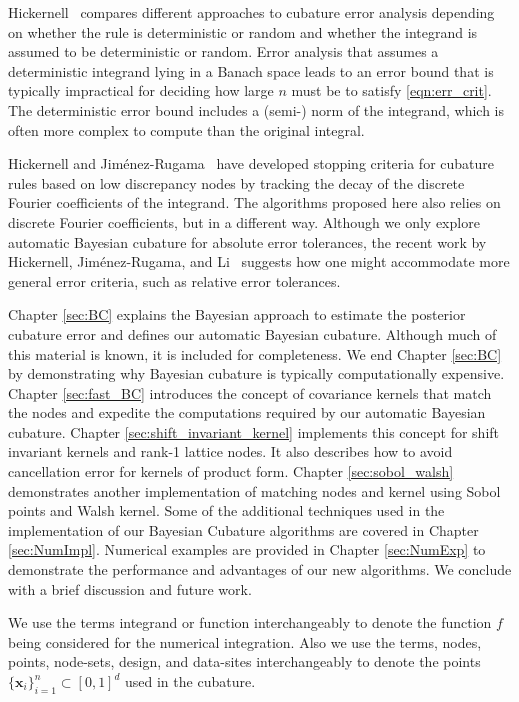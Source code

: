 \documentclass{iitthesis}          %
\newcommand{\bm}[1]{\boldsymbol{#1}}
\newcommand{\vx}{\bm{x}}
\begin{document}

Hickernell~\cite{Hic17a} compares different approaches to cubature error analysis depending on whether the rule is deterministic or random and whether the integrand is assumed to be deterministic or random.  Error analysis that assumes a deterministic integrand lying in a Banach space leads to an error bound that is typically impractical for deciding how large $n$ must be to satisfy \eqref{eqn:err_crit}.  The deterministic error bound includes a (semi-) norm of the integrand, which is often more complex to compute than the original integral.

Hickernell and Jim\'enez-Rugama~\cite{HicJim16a,JimHic16a} have developed stopping criteria for cubature rules based on low discrepancy nodes by tracking the decay of the discrete Fourier coefficients of the integrand.  The algorithms proposed here also relies on discrete Fourier coefficients, but in a different way.  Although we only explore automatic Bayesian cubature for absolute error tolerances, the recent work by Hickernell, Jim\'enez-Rugama, and Li~\cite{HicEtal17a} suggests how one might accommodate more general error criteria, such as relative error tolerances.

Chapter \ref{sec:BC} explains the Bayesian approach to estimate the posterior cubature error and defines our automatic Bayesian cubature. Although much of this material is known, it is included for completeness.  We end Chapter \ref{sec:BC}  by demonstrating why Bayesian cubature is typically computationally expensive.
Chapter \ref{sec:fast_BC}  introduces the concept of covariance kernels that match the nodes and expedite the computations required by our automatic Bayesian cubature. 
Chapter \ref{sec:shift_invariant_kernel} implements this concept for shift invariant kernels and rank-1 lattice nodes.  It also describes how to avoid cancellation error for kernels of product form.  
Chapter \ref{sec:sobol_walsh} demonstrates another implementation of matching nodes and kernel using Sobol points and Walsh kernel.
Some of the additional techniques used in the implementation of our Bayesian Cubature algorithms are covered in Chapter \ref{sec:NumImpl}.
Numerical examples are provided in Chapter \ref{sec:NumExp} to demonstrate the performance and advantages of our new algorithms.  We conclude with a brief discussion and future work.


We use the terms integrand or function interchangeably to denote the function $f$ being considered for the numerical integration. Also we use the terms, nodes, points, node-sets, design, and data-sites interchangeably to denote the points $\{\vx_i\}_{i=1}^n \subset [0,1]^d$ used in the cubature.
\end{document}

